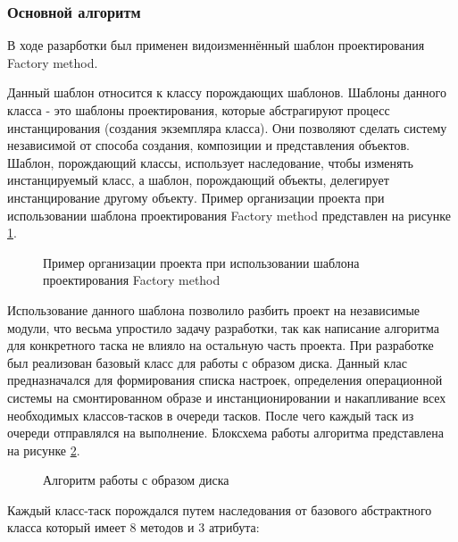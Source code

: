 \subsubsection{Основной алгоритм}
В ходе разарботки был применен видоизменнённый шаблон проектирования Factory method.

Данный шаблон относится к классу порождающих шаблонов. Шаблоны данного класса - это шаблоны проектирования, которые абстрагируют процесс инстанцирования (создания экземпляра класса). Они позволяют сделать систему независимой от способа создания, композиции и представления объектов. Шаблон, порождающий классы, использует наследование, чтобы изменять инстанцируемый класс, а шаблон, порождающий объекты, делегирует инстанцирование другому объекту.
Пример организации проекта при использовании шаблона проектирования Factory method представлен на рисунке \ref{architech:architech}.

\begin{figure}[h!]
\caption{Пример организации проекта при использовании шаблона проектирования Factory method}
\label{architech:architech}
\end{figure}

Использование данного шаблона позволило разбить проект на независимые модули, что весьма упростило задачу разработки, так как написание алгоритма для конкретного таска не влияло на остальную часть проекта. При разработке был реализован базовый класс для работы с образом диска. Данный клас предназначался для формирования списка настроек, определения операционной системы на смонтированном образе и инстанционировании и накапливание всех необходимых классов-тасков в очереди тасков. После чего каждый таск из очереди отправлялся на выполнение. Блоксхема работы алгоритма представлена на рисунке \ref{alg_main:alg_main}.

\begin{figure}[h!]
\caption{Алгоритм работы с образом диска}
\label{alg_main:alg_main}
\end{figure}

Каждый класс-таск порождался путем наследования от базового абстрактного класса который имеет 8 методов и 3 атрибута:

